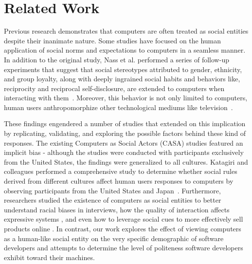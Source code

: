 \documentclass{sig-alternate-05-2015}
\begin{document}
\section{Related Work}
Previous research demonstrates that computers are often treated as social entities despite their inanimate nature. Some studies have focused on the human application of social norms and expectations to computers in a seamless manner. In addition to the original study, Nass et al. performed a series of follow-up experiments that suggest that social stereotypes attributed to gender, ethnicity, and group loyalty, along with deeply ingrained social habits and behaviors like, reciprocity and reciprocal self-disclosure, are extended to computers when interacting with them~\cite{Nass2000machines,nass1999people}. Moreover, this behavior is not only limited to computers, human users anthropomorphize other technological mediums like television~\cite{reeves1996people}.

These findings engendered a number of studies that extended on this implication by replicating, validating, and exploring the possible factors behind these kind of responses. The existing Computers as Social Actors (CASA) studies featured an implicit bias - although the studies were conducted with participants exclusively from the United States, the findings were generalized to all cultures. Katagiri and colleagues performed a comprehensive study to determine whether social rules derived from different cultures affect human users responses to computers by observing participants from the United States and Japan~\cite{katagiri2001cross}. Furthermore, researchers studied the existence of computers as social entities to better understand racial biases in interviews\cite{krysan2003race}, how the quality of interaction affects expressive systems \cite{vidyarthi2011sympathetic}, and even how to leverage social cues to more effectively sell products online \cite{wang2007can}. In contrast, our work explores the effect of viewing computers as a human-like social entity on the very specific demographic of software developers and attempts to determine the level of politeness software developers exhibit toward their machines.
\end{document}
